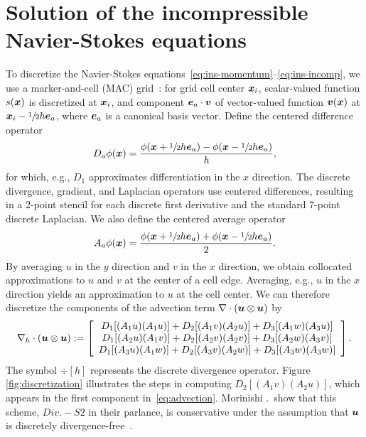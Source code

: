 \section{Solution of the incompressible Navier-Stokes equations}\label{sec:ins}

To discretize the Navier-Stokes equations~\eqref{eq:ins-momentum}--\eqref{eq:ins-incomp},
we use a marker-and-cell (MAC) grid~\cite{Welch:1965jv}: for grid cell center $\boldsymbol{x}_i$,
scalar-valued function $s(\boldsymbol{x})$ is discretized at $\boldsymbol{x}_i$, and component $\boldsymbol{e}_a\cdot\boldsymbol{v}$
of vector-valued function $\boldsymbol{v}(\boldsymbol{x})$ at $\boldsymbol{x}_i - \sfrac12h\boldsymbol{e}_a$, where $\boldsymbol{e}_a$ is a
canonical basis vector. Define the centered difference operator
\begin{equation*}
    D_a\phi(\boldsymbol{x}) = \frac{\phi(\boldsymbol{x}+\sfrac12 h\boldsymbol{e}_a) - \phi(\boldsymbol{x}-\sfrac12 h\boldsymbol{e}_a)}{h},
\end{equation*}
for which, e.g., $D_1$ approximates differentiation in the $x$ direction. The discrete
divergence, gradient, and Laplacian operators use centered differences, resulting in a
2-point stencil for each discrete first derivative and the standard 7-point discrete
Laplacian. We also define the centered average operator
\begin{equation*}
    A_a\phi(\boldsymbol{x}) = \frac{\phi(\boldsymbol{x}+\sfrac12 h\boldsymbol{e}_a) + \phi(\boldsymbol{x}-\sfrac12 h\boldsymbol{e}_a)}2.
\end{equation*}
By averaging $u$ in the $y$ direction and $v$ in the $x$ direction, we obtain collocated
approximations to $u$ and $v$ at the center of a cell edge. Averaging, e.g., $u$ in the
$x$ direction yields an approximation to $u$ at the cell center. We can therefore
discretize the components of the advection term $\div(\u\otimes\u)$ by
\begin{equation}\label{eq:advection}
    \div[h](\u\otimes\u) := %
    \left[\begin{array}{c}
        D_1[(A_1 u) (A_1 u)] + D_2[(A_1 v) (A_2 u)] + D_3[(A_1 w) (A_3 u)] \\
        D_1[(A_2 u) (A_1 v)] + D_2[(A_2 v) (A_2 v)] + D_3[(A_2 w) (A_3 v)] \\
        D_1[(A_3 u) (A_1 w)] + D_2[(A_3 v) (A_2 w)] + D_3[(A_3 w) (A_3 w)]
    \end{array}\right].
\end{equation}
The symbol $\div[h]$ represents the discrete divergence operator. Figure~%
\ref{fig:discretization} illustrates the steps in computing $D_2[(A_1 v)(A_2 u)]$, which
appears in the first component in~\eqref{eq:advection}. Morinishi .\ show
that this scheme, $Div. - S2$ in their parlance, is conservative under the assumption
that $\boldsymbol{u}$ is discretely divergence-free~\cite{Morinishi:1998us}.

